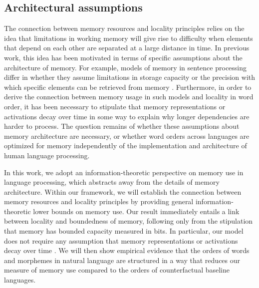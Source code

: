 \subsection{Architectural assumptions}

The connection between memory resources and locality principles relies on the idea that limitations in working memory will give rise to difficulty when elements that depend on each other are separated at a large distance in time. In previous work, this idea has been motivated in terms of specific assumptions about the architecture of memory. For example, models of memory in sentence processing differ in whether they assume limitations in storage capacity \citep[e.g., `memory cost' in the model of][]{gibson1998linguistic} or the precision with which specific elements can be retrieved from memory \citep[e.g.][]{lewis-activation-based-2005}. Furthermore, in order to derive the connection between memory usage in such models and locality in word order, it has been necessary to stipulate that memory representations or activations decay over time in some way to explain why longer dependencies are harder to process.
The question remains of whether these assumptions about memory architecture are necessary, or whether word orders across languages are optimized for memory independently of the implementation and architecture of human language processing.

In this work, we adopt an information-theoretic perspective on memory use in language processing, which abstracts away from the details of memory architecture. 
Within our framework, we will establish the connection between memory resources and locality principles by providing general information-theoretic lower bounds on memory use.
Our result immediately entails a link between locality and boundedness of memory, following only from the stipulation that memory has bounded capacity measured in bits. 
In particular, our model does not require any assumption that memory representations or activations decay over time \citep[as was required in][]{gibson1998linguistic, lewis-activation-based-2005, futrell2020lossy}.
We will then show empirical evidence that the orders of words and morphemes in natural language are structured in a way that reduces our measure of memory use compared to the orders of counterfactual baseline languages.


